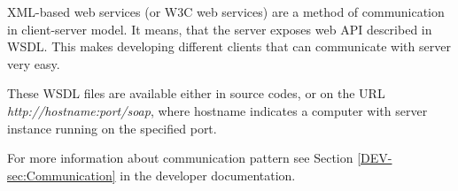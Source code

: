 XML-based web services (or W3C web services) are a method of communication in
\textan{} client-server model. It means, that the server exposes web API described
in WSDL. This makes developing different clients that can communicate with
\textan{} server very easy.

These WSDL files are available either in source codes, or on the URL
\emph{http://hostname:port/soap}, where hostname indicates a computer with
\textan{} server instance running on the specified port.

For more information about communication pattern see Section
\ref{DEV-sec:Communication} in the developer documentation.
